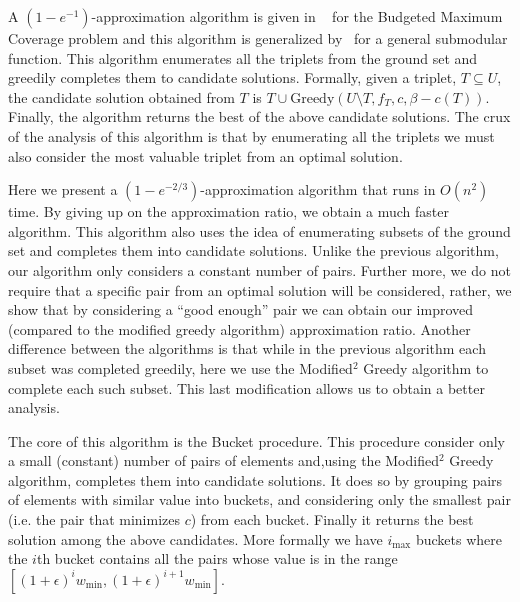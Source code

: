 \def\pLarge{P_{\text{large}}}
\def\pVal{P_{\text{val}}}

A $(1-e^{-1})$-approximation algorithm is given in ~\cite{khuller1999budgeted} for the Budgeted Maximum Coverage problem and this algorithm is generalized by~\cite{sviridenko2004note} for a general submodular function.
This algorithm enumerates all the triplets from the ground set and greedily completes them to candidate solutions.
Formally, given a triplet, $T \subseteq U$, the candidate solution obtained from $T$ is $T \cup \text{Greedy}(U \setminus T, f_T, c, \beta - c(T))$.
Finally, the algorithm returns the best of the above candidate solutions.
The crux of the analysis of this algorithm is that by enumerating all the triplets we must also consider the most valuable triplet from an optimal solution.

Here we present a $(1-e^{-2/3})$-approximation algorithm that runs in $O(n^2)$ time.
By giving up on the approximation ratio, we obtain a much faster algorithm.
This algorithm also uses the idea of enumerating subsets of the ground set and completes them into candidate solutions.
Unlike the previous algorithm, our algorithm only considers a constant number of pairs.
Further more, we do not require that a specific pair from an optimal solution will be considered, rather, we show that by considering a ``good enough'' pair we can obtain our improved (compared to the modified greedy algorithm) approximation ratio.
Another difference between the algorithms is that while in the previous algorithm each subset was completed greedily, here we use the Modified$^2$ Greedy algorithm to complete each such subset.
This last modification allows us to obtain a better analysis.

The core of this algorithm is the Bucket procedure.
This procedure consider only a small (constant) number of pairs of elements and,using the Modified$^2$ Greedy algorithm, completes them into candidate solutions.
It does so by grouping pairs of elements with similar value into buckets,
and considering only the smallest pair (i.e. the pair that minimizes $c$) from each bucket. 
Finally it returns the best solution among the above candidates.
More formally we have $i_{\max}$ buckets where the $i$th bucket contains all the pairs whose value is in the range $[(1 + \epsilon)^i w_{\min}, (1 + \epsilon)^{i + 1} w_{\min}]$.

